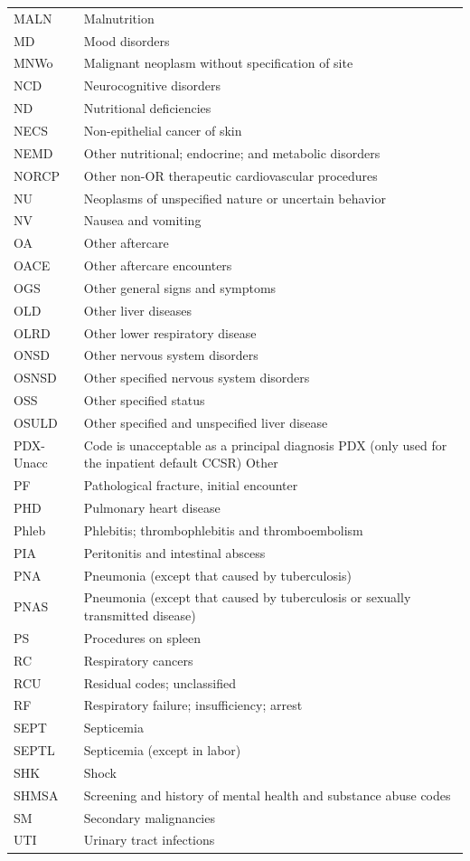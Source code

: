 {\begin{longtable}{ll}
MALN & Malnutrition \\
MD & Mood disorders \\
MNWo & Malignant neoplasm without specification of site \\
NCD & Neurocognitive disorders \\
ND & Nutritional deficiencies \\
NECS & Non-epithelial cancer of skin \\
NEMD & Other nutritional; endocrine; and metabolic disorders \\
NORCP & Other non-OR therapeutic cardiovascular procedures \\
NU & Neoplasms of unspecified nature or uncertain behavior \\
NV & Nausea and vomiting \\
OA & Other aftercare \\
OACE & Other aftercare encounters \\
OGS & Other general signs and symptoms \\
OLD & Other liver diseases \\
OLRD & Other lower respiratory disease \\
ONSD & Other nervous system disorders \\
OSNSD & Other specified nervous system disorders \\
OSS & Other specified status \\
OSULD & Other specified and unspecified liver disease \\
PDX-Unacc & Code is unacceptable as a principal diagnosis PDX (only used for the inpatient default CCSR) Other \\
PF & Pathological fracture, initial encounter \\
PHD & Pulmonary heart disease \\
Phleb & Phlebitis; thrombophlebitis and thromboembolism \\
PIA & Peritonitis and intestinal abscess \\
PNA & Pneumonia (except that caused by tuberculosis) \\
PNAS & Pneumonia (except that caused by tuberculosis or sexually transmitted disease) \\
PS & Procedures on spleen \\
RC & Respiratory cancers \\
RCU & Residual codes; unclassified \\
RF & Respiratory failure; insufficiency; arrest \\
SEPT & Septicemia \\
SEPTL & Septicemia (except in labor) \\
SHK & Shock \\
SHMSA & Screening and history of mental health and substance abuse codes \\
SM & Secondary malignancies \\
UTI & Urinary tract infections \\

\end{longtable}
}